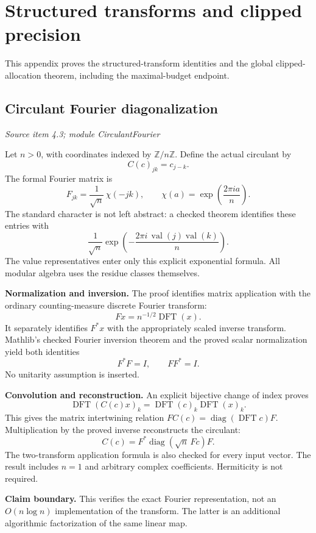 \clearpage\FloatBarrier\section{Structured transforms and clipped precision}\label{supp4:section:001}
This appendix proves the structured-transform identities and the global clipped-allocation theorem, including the maximal-budget endpoint.\par

\subsection{Circulant Fourier diagonalization}\label{supp4:subsection:001}\textit{Source item 4.3; module CirculantFourier}\par
Let $n>0$, with coordinates indexed by $\mathbb Z/n\mathbb Z$. Define the actual circulant by
\[
C(c)_{jk}=c_{j-k}.
\]
The formal Fourier matrix is
\[
F_{jk}=\frac{1}{\sqrt n}\,\chi(-jk),
\qquad
\chi(a)=\exp\!\left(\frac{2\pi i a}{n}\right).
\]
The standard character is not left abstract: a checked theorem identifies these entries with
\[
\frac{1}{\sqrt n}\exp\!\left(-\frac{2\pi i\,\operatorname{val}(j)\operatorname{val}(k)}n\right).
\]
The value representatives enter only this explicit exponential formula. All modular algebra uses the residue classes themselves.

\textbf{Normalization and inversion.} The proof identifies matrix application with the ordinary counting-measure discrete Fourier transform:
\[
Fx=n^{-1/2}\operatorname{DFT}(x).
\]
It separately identifies $F^*x$ with the appropriately scaled inverse transform. Mathlib's checked Fourier inversion theorem and the proved scalar normalization yield both identities
\[
\boxed{F^*F=I,\qquad FF^*=I.}
\]
No unitarity assumption is inserted.

\textbf{Convolution and reconstruction.} An explicit bijective change of index proves
\[
\operatorname{DFT}(C(c)x)_k
=\operatorname{DFT}(c)_k\operatorname{DFT}(x)_k.
\]
This gives the matrix intertwining relation $FC(c)=\operatorname{diag}(\operatorname{DFT}c)F$. Multiplication by the proved inverse reconstructs the circulant:
\[
\boxed{C(c)=F^*\operatorname{diag}(\sqrt n\,Fc)F.}
\]
The two-transform application formula is also checked for every input vector. The result includes $n=1$ and arbitrary complex coefficients. Hermiticity is not required.

\textbf{Claim boundary.} This verifies the exact Fourier representation, not an $O(n\log n)$ implementation of the transform. The latter is an additional algorithmic factorization of the same linear map.



